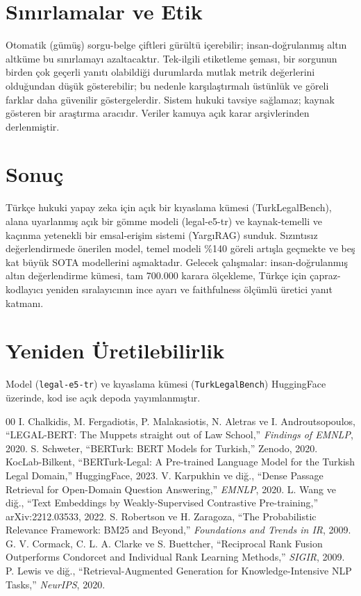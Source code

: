 \documentclass[conference]{IEEEtran}
\begin{document}
\section{Sınırlamalar ve Etik}
Otomatik (gümüş) sorgu-belge çiftleri gürültü içerebilir; insan-doğrulanmış altın altküme bu sınırlamayı azaltacaktır. Tek-ilgili etiketleme şeması, bir sorgunun birden çok geçerli yanıtı olabildiği durumlarda mutlak metrik değerlerini olduğundan düşük gösterebilir; bu nedenle karşılaştırmalı üstünlük ve göreli farklar daha güvenilir göstergelerdir. Sistem hukuki tavsiye sağlamaz; kaynak gösteren bir araştırma aracıdır. Veriler kamuya açık karar arşivlerinden derlenmiştir.

\section{Sonuç}
Türkçe hukuki yapay zeka için açık bir kıyaslama kümesi (TurkLegalBench), alana uyarlanmış açık bir gömme modeli (legal-e5-tr) ve kaynak-temelli ve kaçınma yetenekli bir emsal-erişim sistemi (YargıRAG) sunduk. Sızıntısız değerlendirmede önerilen model, temel modeli \%140 göreli artışla geçmekte ve beş kat büyük SOTA modellerini aşmaktadır. Gelecek çalışmalar: insan-doğrulanmış altın değerlendirme kümesi, tam 700.000 karara ölçekleme, Türkçe için çapraz-kodlayıcı yeniden sıralayıcının ince ayarı ve faithfulness ölçümlü üretici yanıt katmanı.

\section*{Yeniden Üretilebilirlik}
Model (\texttt{legal-e5-tr}) ve kıyaslama kümesi (\texttt{TurkLegalBench}) HuggingFace üzerinde, kod ise açık depoda yayımlanmıştır.

\begin{thebibliography}{00}
 I. Chalkidis, M. Fergadiotis, P. Malakasiotis, N. Aletras ve I. Androutsopoulos, ``LEGAL-BERT: The Muppets straight out of Law School,'' \textit{Findings of EMNLP}, 2020.
 S. Schweter, ``BERTurk: BERT Models for Turkish,'' Zenodo, 2020.
 KocLab-Bilkent, ``BERTurk-Legal: A Pre-trained Language Model for the Turkish Legal Domain,'' HuggingFace, 2023.
 V. Karpukhin ve diğ., ``Dense Passage Retrieval for Open-Domain Question Answering,'' \textit{EMNLP}, 2020.
 L. Wang ve diğ., ``Text Embeddings by Weakly-Supervised Contrastive Pre-training,'' arXiv:2212.03533, 2022.
 S. Robertson ve H. Zaragoza, ``The Probabilistic Relevance Framework: BM25 and Beyond,'' \textit{Foundations and Trends in IR}, 2009.
 G. V. Cormack, C. L. A. Clarke ve S. Buettcher, ``Reciprocal Rank Fusion Outperforms Condorcet and Individual Rank Learning Methods,'' \textit{SIGIR}, 2009.
 P. Lewis ve diğ., ``Retrieval-Augmented Generation for Knowledge-Intensive NLP Tasks,'' \textit{NeurIPS}, 2020.
\end{thebibliography}
\end{document}
